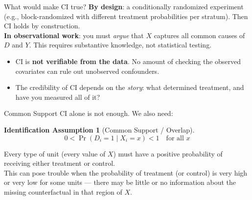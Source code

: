 \documentclass[xcolor=dvipsnames]{beamer}
\newtheorem{iass}{Identification Assumption}
\begin{document}
\begin{frame}{What would make CI true?}
\small
{} \textbf{By design}: a conditionally randomized experiment (e.g., block-randomized with different treatment probabilities per stratum).  Then CI holds by construction.\\

\bigskip
{} \textbf{In observational work}: you must \textit{argue} that $X$ captures all common causes of $D$ and $Y$.  This requires substantive knowledge, not statistical testing.\\

\medskip
{}
\begin{itemize}
\footnotesize
\item<3-> CI is \textbf{not verifiable from the data}.  No amount of checking the observed covariates can rule out unobserved confounders.
\item<4-> The credibility of CI depends on the \textit{story}: what determined treatment, and have you measured all of it?
\end{itemize}
\end{frame}


\begin{frame}{Common Support}
\small
{} CI alone is not enough.  We also need:
\begin{iass}[Common Support / Overlap]
$$0 < \Pr(D_i = 1 \mid X_i = x) < 1 \quad \text{for all } x$$
\end{iass}

 Every type of unit (every value of $X$) must have a positive probability of receiving either treatment or control.\\

\medskip
{} This can pose trouble when the probability of treatment (or control) is very high or very low for some units --- there may be little or no information about the missing counterfactual in that region of $X$.
\end{frame}
\end{document}
